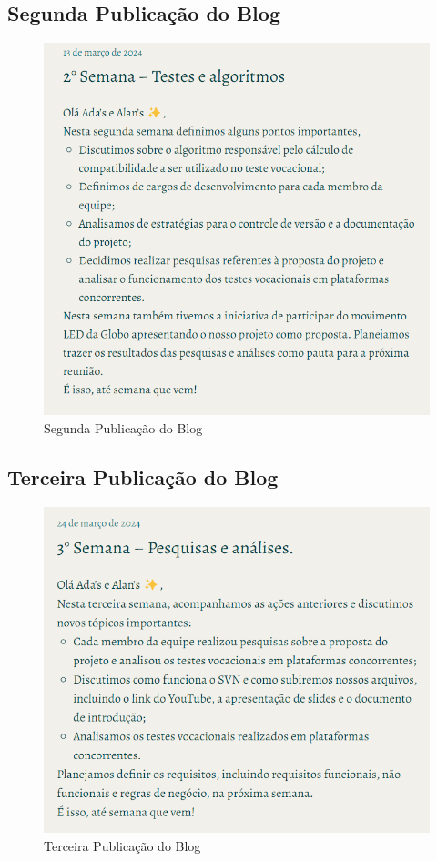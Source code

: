 \begin{apendicesenv}
\subsection*{Segunda Publicação do Blog}
\begin{figure}[H]
    \centering
    \includegraphics[width=1.0\linewidth]{images/Post2.png}
    \caption{Segunda Publicação do Blog}
    \label{fig:segunda}
\end{figure}

\subsection*{Terceira Publicação do Blog}
\begin{figure}[H]
    \centering
    \includegraphics[width=1.0\linewidth]{images/Post3.png}
    \caption{Terceira Publicação do Blog}
    \label{fig:terceira}
\end{figure}


\end{apendicesenv}
